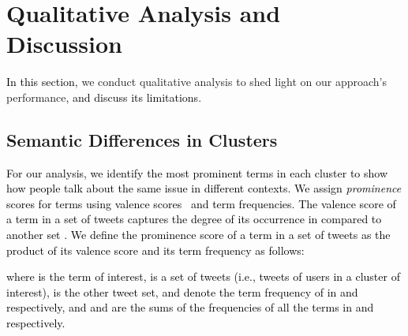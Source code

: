 \documentclass[letterpaper]{article} \usepackage{aaai20}  \usepackage{times}  \usepackage{stackengine}
\newcommand{\changes}{\textcolor{black}}
\begin{document}
\section{Qualitative Analysis and Discussion}\label{sec_discussion}
\changes{In this section,} we conduct qualitative analysis to shed light on our approach's performance\changes{, and discuss its limitations}. 

\subsection{Semantic Differences in Clusters}
\changes{For our analysis, we identify the most prominent terms in each cluster 
to show how people talk about the same issue in different contexts.
We assign \textit{prominence} scores for terms using valence scores~\citep{conover2011political} and term frequencies. The valence score of a term in a set of tweets  captures the degree of its occurrence in  compared to another set .
We define the prominence score of a term in a set of tweets as the product of its valence score and its term frequency as follows: }
 \changes{
 
\noindent
where  is the term of interest,  is a set of tweets (i.e., tweets of users in a cluster of interest),  is the other tweet set,  and  denote the term frequency of  in  and  respectively, and  and  are the sums of the frequencies of all the terms in  and  respectively.}
 
\end{document}
